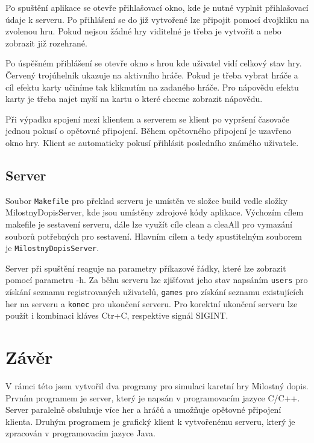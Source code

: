 \documentclass[12pt, a4paper]{article}
\begin{document}
Po spuštění aplikace se otevře přihlašovací okno, kde je nutné vyplnit přihlašovací údaje k serveru. Po přihlášení se do již vytvořené lze připojit pomocí dvojkliku na zvolenou hru. Pokud nejsou žádné hry viditelné je třeba je vytvořit a nebo zobrazit již rozehrané.

Po úspěšném přihlášení se otevře okno s hrou kde uživatel vidí celkový stav hry. Červený trojúhelník ukazuje na aktivního hráče. Pokud je třeba vybrat hráče a cíl efektu karty učiníme tak kliknutím na zadaného hráče. Pro nápovědu efektu karty je třeba najet myší na kartu o které chceme zobrazit nápovědu.

Při výpadku spojení mezi klientem a serverem se klient po vypršení časovače jednou pokusí o opětovné připojení. Během opětovného připojení je uzavřeno okno hry. Klient se automaticky pokusí přihlásit posledního známého uživatele.

\subsection{Server}

Soubor \texttt{Makefile} pro překlad serveru je umístěn ve složce build vedle složky MilostnyDopisServer, kde jsou umístěny zdrojové kódy aplikace. Výchozím cílem makefile je sestavení serveru, dále lze využít cíle clean a cleaAll pro vymazání souborů potřebných pro sestavení. Hlavním cílem a tedy spustitelným souborem je \texttt{MilostnyDopisServer}.

Server při spuštění reaguje na parametry příkazové řádky, které lze zobrazit pomocí parametru -h. Za běhu serveru lze zjišťovat jeho stav napsáním \texttt{users} pro získání seznamu registrovaných uživatelů, \texttt{games} pro získání seznamu existujících her na serveru a \texttt{konec} pro ukončení serveru. Pro korektní ukončení serveru lze použít i kombinaci kláves Ctr+C, respektive signál SIGINT. 

\newpage
\section{Závěr}  %
V rámci této jsem vytvořil dva programy pro simulaci karetní hry Milostný dopis. Prvním programem je server, který je napsán v programovacím jazyce C/C++. Server paralelně obsluhuje více her a hráčů a umožňuje opětovné připojení klienta. Druhým programem je grafický klient k vytvořenému serveru, který je zpracován v programovacím jazyce Java.
\end{document}
